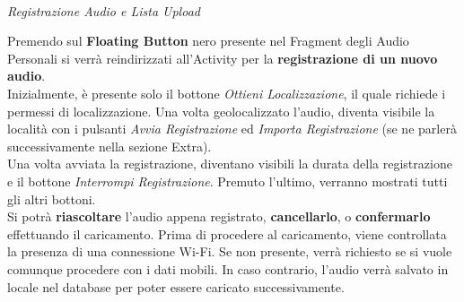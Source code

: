\documentclass{article}
\begin{document}
\quad \vspace*{60pt}\\
\textit{Registrazione Audio e Lista Upload}\\
\begin{minipage}[t]{0.6\textwidth}
    \raggedright
    \vspace*{10pt}
    Premendo sul \textbf{Floating Button} nero presente nel Fragment degli Audio Personali si verrà reindirizzati all'Activity per la \textbf{registrazione di un nuovo audio}.\\
    Inizialmente, è presente solo il bottone \textit{Ottieni Localizzazione}, il quale richiede i permessi di localizzazione. Una volta geolocalizzato l'audio, diventa visibile la località con i pulsanti \textit{Avvia Registrazione} ed \textit{Importa Registrazione} (se ne parlerà successivamente nella sezione Extra).\\
    Una volta avviata la registrazione, diventano visibili la durata della registrazione e il bottone \textit{Interrompi Registrazione}. Premuto l'ultimo, verranno mostrati tutti gli altri bottoni.\\
    Si potrà \textbf{riascoltare} l'audio appena registrato, \textbf{cancellarlo}, o \textbf{confermarlo} effettuando il caricamento. Prima di procedere al caricamento, viene controllata la presenza di una connessione Wi-Fi. Se non presente, verrà richiesto se si vuole comunque procedere con i dati mobili. In caso contrario, l'audio verrà salvato in locale nel database per poter essere caricato successivamente.
\end{minipage}
\hfill
\end{document}
